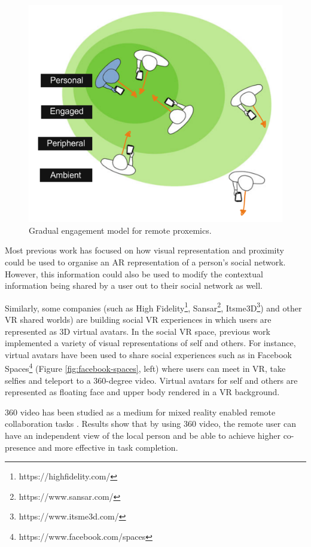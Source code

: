 \begin{figure}
    \centering
    \includegraphics[width=.8\linewidth]{images/Sousa2016.PNG}
    \caption{Gradual engagement model for remote proxemics. \cite{Sousa2016}}
    \label{fig:Sousa2016}
\end{figure}

Most previous work has focused on how visual representation and proximity could be used to organise an AR representation of a person's social network. However, this information could also be used to modify the contextual information being shared by a user out to their social network as well. 

Similarly, some companies (such as High Fidelity\footnote{https://highfidelity.com/}, Sansar\footnote{https://www.sansar.com/}, Itsme3D\footnote{https://www.itsme3d.com/}) and other VR shared worlds) are building social VR experiences in which users are represented as 3D virtual avatars. In the social VR space, previous work implemented a variety of visual representations of self and others. For instance, virtual avatars have been used to share social experiences such as in Facebook Spaces\footnote{https://www.facebook.com/spaces} (Figure \ref{fig:facebook-spaces}, left) where users can meet in VR, take selfies and teleport to a 360-degree video. Virtual avatars for self and others are represented as floating face and upper body rendered in a VR background. 

360 video has been studied as a medium for mixed reality enabled remote collaboration tasks \cite{Tang2017a, Lee2017, lee2017mixed, Lee2019}. Results show that by using 360 video, the remote user can have an independent view of the local person and be able to achieve higher co-presence and more effective in task completion. 


